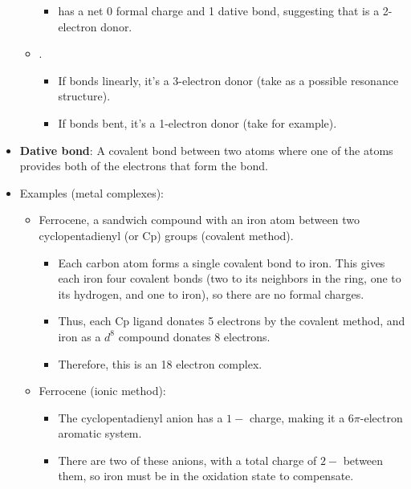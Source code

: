 \documentclass[../notes.tex]{subfiles}
\begin{document}
\begin{itemize}
\begin{itemize}
\begin{itemize}
            \item {}\quad has a net 0 formal charge and 1 dative bond, suggesting that  is a 2-electron donor.
        \end{itemize}
        \item {}.
        \begin{itemize}
            \item If  bonds linearly, it's a 3-electron donor (take \quad as a possible resonance structure).
            \item If  bonds bent, it's a 1-electron donor (take \quad for example).
        \end{itemize}
    \end{itemize}
    \item \textbf{Dative bond}: A covalent bond between two atoms where one of the atoms provides both of the electrons that form the bond.
    \item Examples (metal complexes):
    \begin{itemize}
        \item Ferrocene, a sandwich compound with an iron atom between two cyclopentadienyl (or Cp) groups (covalent method).
        \begin{itemize}
            \item Each carbon atom forms a single covalent bond to iron. This gives each iron four covalent bonds (two to its neighbors in the ring, one to its hydrogen, and one to iron), so there are no formal charges.
            \item Thus, each Cp ligand donates 5 electrons by the covalent method, and iron as a $d^8$ compound donates 8 electrons.
            \item Therefore, this is an 18 electron complex.
        \end{itemize}
        \item Ferrocene (ionic method):
        \begin{itemize}
            \item The cyclopentadienyl anion has a $1-$ charge, making it a $6\pi$-electron aromatic system.
            \item There are two of these anions, with a total charge of $2-$ between them, so iron must be in the  oxidation state to compensate.

\end{itemize}
\end{itemize}
\end{itemize}
\end{document}
